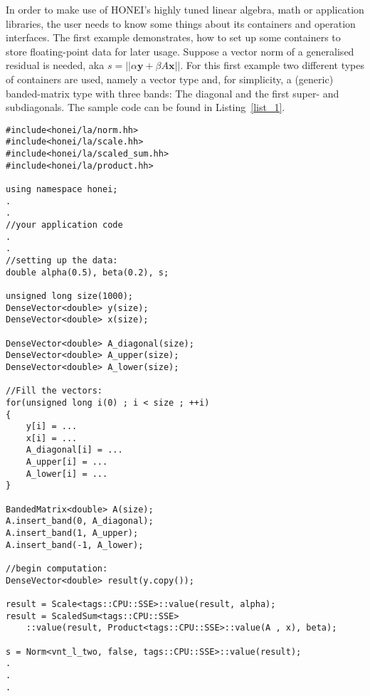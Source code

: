 \documentclass{article}
\begin{document}
In order to make use of HONEI's highly tuned linear algebra, math or application libraries, the user needs to know some things about its containers and operation interfaces. The first example demonstrates, how to set up some containers to store floating-point data for later usage. Suppose a vector norm of a generalised residual is needed, aka $s = || \alpha\mathbf{y} + \beta A \mathbf{x} ||$. For this first example two different types of containers are used, namely a vector type and, for simplicity, a (generic) banded-matrix type with three bands: The diagonal and the first super- and subdiagonals. The sample code can be found in Listing~\ref{list_1}.

\begin{lstlisting}[float, caption= Using HONEI - A first application example, label=list_1]
#include<honei/la/norm.hh>
#include<honei/la/scale.hh>
#include<honei/la/scaled_sum.hh>
#include<honei/la/product.hh>

using namespace honei;
.
.
//your application code
.
.
//setting up the data:
double alpha(0.5), beta(0.2), s;

unsigned long size(1000);
DenseVector<double> y(size);
DenseVector<double> x(size);

DenseVector<double> A_diagonal(size);
DenseVector<double> A_upper(size);
DenseVector<double> A_lower(size);

//Fill the vectors:
for(unsigned long i(0) ; i < size ; ++i)
{
    y[i] = ...
    x[i] = ...
    A_diagonal[i] = ...
    A_upper[i] = ...
    A_lower[i] = ...
}

BandedMatrix<double> A(size);
A.insert_band(0, A_diagonal);
A.insert_band(1, A_upper);
A.insert_band(-1, A_lower);

//begin computation:
DenseVector<double> result(y.copy());

result = Scale<tags::CPU::SSE>::value(result, alpha);
result = ScaledSum<tags::CPU::SSE>
	::value(result, Product<tags::CPU::SSE>::value(A , x), beta);

s = Norm<vnt_l_two, false, tags::CPU::SSE>::value(result);
.
.
.
\end{lstlisting}
\end{document}
